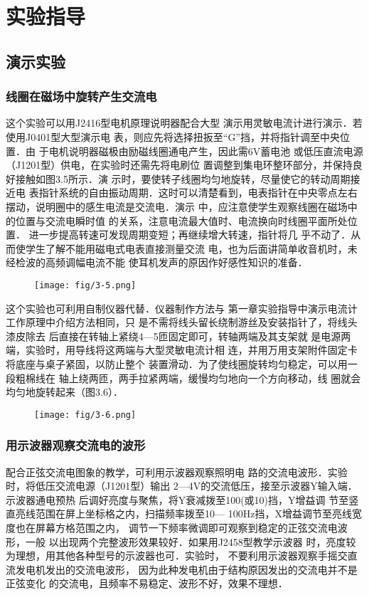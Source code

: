 \section{实验指导}
\subsection{演示实验}
\subsubsection{线圈在磁场中旋转产生交流电}

这个实验可以用J2416型电机原理说明器配合大型
演示用灵敏电流计进行演示．若使用J0401型大型演示电
表，则应先将选择扭扳至“G”挡，并将指针调至中央位置．由
于电机说明器磁极由励磁线圈通电产生，因此需6V蓄电池
或低压直流电源（J1201型）供电，在实验时还需先将电刷位
置调整到集电环整环部分，并保持良好接触如图3.5所示．演
示时，要使转子线圈均匀地旋转，尽量使它的转动周期接近电
表指针系统的自由振动周期．这时可以清楚看到，电表指针在中央零点左右摆动，说明圈中的感生电流是交流电．演示
中，应注意使学生观察线圈在磁场中的位置与交流电瞬时值
的关系，注意电流最大值时、电流换向时线圈平面所处位置．
进一步提高转速可发现周期变短；再继续增大转速，指针将几
乎不动了．从而使学生了解不能用磁电式电表直接测量交流
电，也为后面讲简单收音机时，未经检波的高频调幅电流不能
使耳机发声的原因作好感性知识的准备．
\begin{figure}[htp]
    \centering
\texttt{[image: fig/3-5.png]}
    \caption{}
\end{figure}

这个实验也可利用自制仪器代替．仪器制作方法与
第一章实验指导中演示电流计工作原理中介绍方法相同，只
是不需将线头留长绕制游丝及安装指针了，将线头漆皮除去
后直接在转轴上紧绕4—5匝固定即可，转轴两端及其支架就
是电源两端，实验时，用导线将这两端与大型灵敏电流计相
连，并用万用支架附件固定卡将底座与桌子紧固，以防止整个
装置滑动．为了使线圈旋转均匀稳定，可以用一段粗棉线在
轴上绕两匝，两手拉紧两端，缓慢均匀地向一个方向移动，线
圈就会均匀地旋转起来（图3.6）．

\begin{figure}[htp]
    \centering
\texttt{[image: fig/3-6.png]}
    \caption{}
\end{figure}

\subsubsection{用示波器观察交流电的波形}
配合正弦交流电图象的教学，可利用示波器观察照明电
路的交流电波形．实验时，将低压交流电源（J1201型）输出
2—4V的交流低压，接至示波器Y输入端．示波器通电预热
后调好亮度与聚焦，将Y衰减拨至100(或10)挡，Y增益调
节至竖直亮线范围在屏上坐标格之内，扫描频率拨至10—
100Hz挡，X增益调节至亮线宽度也在屏幕方格范围之内，
调节一下频率微调即可观察到稳定的正弦交流电波形，一般
以出现两个完整波形效果较好．如果用J2458型教学示波器
时，亮度较为理想，用其他各种型号的示波器也可．实验时，
不要利用示波器观察手摇交直流发电机发出的交流电波形，
因为此种发电机由于结构原因发出的交流电并不是正弦变化
的交流电，且频率不易稳定、波形不好，效果不理想．

